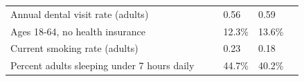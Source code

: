 \documentclass[9pt]{report}
\begin{document}
\begin{tabular}{p{.10in}p{.10in}p{.10in}p{3.7in}>{\hfill}p{.85in}>{\hfill}p{.85in}>{\hfill}p{.85in}>{\hfill}p{.85in}p{0.1in}}
\multicolumn{4}{l}{\parbox{3.6in}{\strut\raggedright{{Annual dental visit rate (adults)}}\strut}} &  &  & 0.56 & 0.59 & \multicolumn{1}{l}{}  \\ 
\multicolumn{4}{l}{\parbox{3.6in}{\strut\raggedright{{Ages 18-64, no health insurance}}\strut}} &  &  & 12.3\% & 13.6\% & \multicolumn{1}{l}{}  \\ 
\multicolumn{4}{l}{\parbox{3.6in}{\strut\raggedright{{Current smoking rate (adults)}}\strut}} &  &  & 0.23 & 0.18 & \multicolumn{1}{l}{}  \\ 
\multicolumn{4}{l}{\parbox{3.6in}{\strut\raggedright{{Percent adults sleeping under 7 hours daily}}\strut}} &  &  & 44.7\% & 40.2\% & \multicolumn{1}{l}{}  \\ 

\end{tabular}
\setlength{\tabcolsep}{6pt} %


\vspace{36pt}
\linespread{1.5}
\theendnotes
\end{document}
